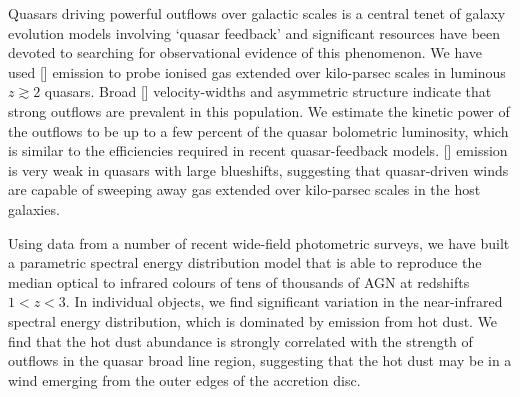 Quasars driving powerful outflows over galactic scales is a central tenet of galaxy evolution models involving `quasar feedback' and significant resources have been devoted to searching for observational evidence of this phenomenon.  
We have used [] emission to probe ionised gas extended over kilo-parsec scales in luminous $z\gtrsim2$ quasars.
Broad [] velocity-widths and asymmetric structure indicate that strong outflows are prevalent in this population.  
We estimate the kinetic power of the outflows to be up to a few percent of the quasar bolometric luminosity, which is similar to the efficiencies required in recent quasar-feedback models. 
[] emission is very weak in quasars with large  blueshifts, suggesting that quasar-driven winds are capable of sweeping away gas extended over kilo-parsec scales in the host galaxies. 

Using data from a number of recent wide-field photometric surveys, we have built a parametric spectral energy distribution model that is able to reproduce the median optical to infrared colours of tens of thousands of AGN at redshifts $1 < z < 3$. 
In individual objects, we find significant variation in the near-infrared spectral energy distribution, which is dominated by emission from hot dust. 
We find that the hot dust abundance is strongly correlated with the strength of outflows in the quasar broad line region, suggesting that the hot dust may be in a wind emerging from the outer edges of the accretion disc. 

\vfill

\endgroup			

\vfill